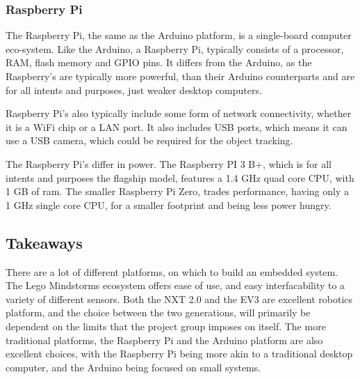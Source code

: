 \subsubsection{Raspberry Pi}
The Raspberry Pi, the same as the Arduino platform, is a single-board computer eco-system.
Like the Arduino, a Raspberry Pi, typically consists of a processor, RAM, flash memory and GPIO pins.
It differs from the Arduino, as the Raspberry's are typically more powerful, than their Arduino counterparts and are for all intents and purposes, just weaker desktop computers.

Raspberry Pi's also typically include some form of network connectivity, whether it is a WiFi chip or a LAN port.
It also includes USB ports, which means it can use a USB camera, which could be required for the object tracking.

The Raspberry Pi's differ in power.
The Raspberry PI 3 B+, which is for all intents and purposes the flagship model, features a 1.4 GHz quad core CPU, with 1 GB of ram.
The smaller Raspberry Pi Zero, trades performance, having only a 1 GHz single core CPU, for a smaller footprint and being less power hungry.

\subsection{Takeaways}
There are a lot of different platforms, on which to build an embedded system.
The Lego Mindstorms ecosystem offers ease of use, and easy interfacability to a variety of different sensors.
Both the NXT 2.0 and the EV3 are excellent robotics platform, and the choice between the two generations, will primarily be dependent on the limits that the project group imposes on itself.
The more traditional platforms, the Raspberry Pi and the Arduino platform are also excellent choices, with the Raspberry Pi being more akin to a traditional desktop computer, and the Arduino being focused on small systems.

